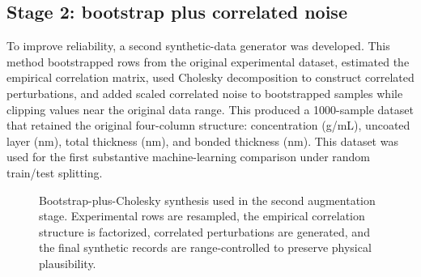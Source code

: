 \documentclass[11pt]{article}
\begin{document}
\subsection{Stage 2: bootstrap plus correlated noise}
\label{sec:bootstrap}
To improve reliability, a second synthetic-data generator was developed.
This method bootstrapped rows from the original experimental dataset,
estimated the empirical correlation matrix, used Cholesky decomposition
to construct correlated perturbations, and added scaled correlated noise
to bootstrapped samples while clipping values near the original data range.
This produced a 1000-sample dataset that retained the original four-column
structure: concentration (g/mL), uncoated layer (nm), total thickness (nm),
and bonded thickness (nm). This dataset was used for the first substantive
machine-learning comparison under random train/test splitting.

\begin{figure}[H]
\centering
{}
\caption{Bootstrap-plus-Cholesky synthesis used in the second augmentation
stage.  Experimental rows are resampled, the empirical correlation structure
is factorized, correlated perturbations are generated, and the final
synthetic records are range-controlled to preserve physical plausibility.}
\end{figure}
\end{document}

